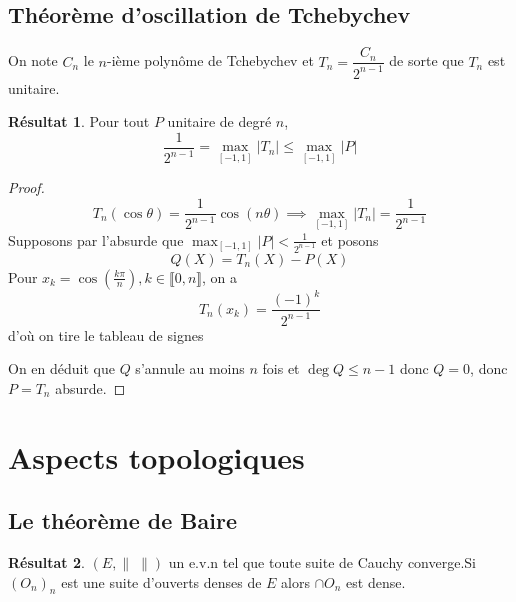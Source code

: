 \documentclass{article}
\theoremstyle{definition}
\newtheorem*{res}{Résultat}
\newcommand{\todo}[1]{{\color{red}À faire: #1}}
\begin{document}
\subsection{Théorème d'oscillation de Tchebychev}

On note $C_n$ le $n$-ième polynôme de Tchebychev et $T_n=\dfrac{C_n}{2^{n-1}}$ de sorte que $T_n$ est unitaire.

\begin{res}
Pour tout $P$ unitaire de degré $n$, \[
    \frac 1{2^{n-1}}=\max_{[-1, 1]}|T_n|\leq \max_{[-1, 1]}|P|
\]
\end{res}

\begin{proof}
\[
    T_n(\cos \theta)=\frac1{2^{n-1}}\cos (n\theta) \implies \max_{[-1, 1]}|T_n|=\frac1{2^{n-1}}
\]
Supposons par l'absurde que $\displaystyle\max_{[-1, 1]}|P|<\frac1{2^{n-1}}$ et posons \[
    Q(X)=T_n(X)-P(X)
\]
Pour $x_k=\cos\left(\frac{k\pi}n\right), k\in\llbracket 0, n\rrbracket$, on a \[
    T_n(x_k)=\frac{(-1)^k}{2^{n-1}}
\]
d'où on tire le tableau de signes
\begin{center}
\end{center}
On en déduit que $Q$ s'annule au moins $n$ fois et $\deg Q\leq n-1$ donc $Q=0$, donc $P=T_n$ absurde.
\end{proof}


\section{Aspects topologiques}

\subsection{Le théorème de Baire}

\begin{res}
$(E, \|\;\|)$ un e.v.n tel que toute suite de Cauchy converge.Si $(O_n)_n$ est une suite d'ouverts denses de $E$ alors $\cap O_n$ est dense.
\end{res}
\end{document}
